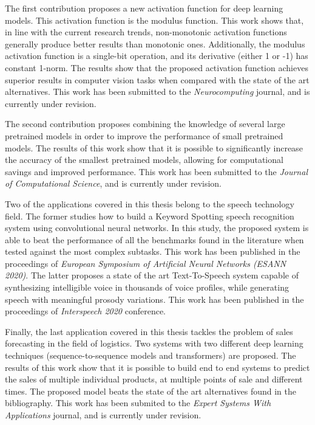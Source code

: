 The first contribution proposes a new activation function for deep learning models. This activation function is the modulus function. This work shows that, in line with the current research trends, non-monotonic activation functions generally produce better results than monotonic ones. Additionally, the modulus activation function is a single-bit operation, and its derivative (either 1 or -1) has constant 1-norm. The results show that the proposed activation function achieves superior results in computer vision tasks when compared with the state of the art alternatives. This work has been submitted to the \textit{Neurocomputing} journal, and is currently under revision.

The second contribution proposes combining the knowledge of several large pretrained models in order to improve the performance of small pretrained models. The results of this work show that it is possible to significantly increase the accuracy of the smallest pretrained models, allowing for computational savings and improved performance. This work has been submitted to the \textit{Journal of Computational Science}, and is currently under revision.

Two of the applications covered in this thesis belong to the speech technology field. The former studies how to build a Keyword Spotting speech recognition system using convolutional neural networks. In this study, the proposed system is able to beat the performance of all the benchmarks found in the literature when tested against the most complex subtasks. This work has been published in the proceedings of \textit{European Symposium of Artificial Neural Networks (ESANN 2020)}. The latter proposes a state of the art Text-To-Speech system capable of synthesizing intelligible voice in thousands of voice profiles, while generating speech with meaningful prosody variations. This work has been published in the proceedings of \textit{Interspeech 2020} conference.

Finally, the last application covered in this thesis tackles the problem of sales forecasting in the field of logistics. Two systems with two different deep learning techniques (sequence-to-sequence models and transformers) are proposed. The results of this work show that it is possible to build end to end systems to predict the sales of multiple individual products, at multiple points of sale and different times. The proposed model beats the state of the art alternatives found in the bibliography. This work has been submited to the \textit{Expert Systems With Applications} journal, and is currently under revision.

